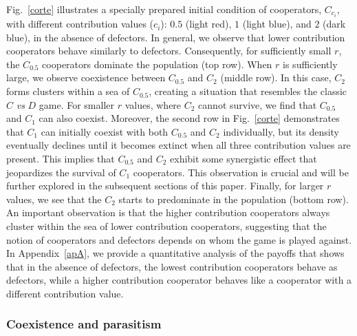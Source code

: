 \documentclass[twocolumn,aps,amsmath,pre,floatfix,superscriptaddress]{revtex4-2}
\begin{document}
Fig.~\ref{corte} illustrates a specially prepared initial condition of cooperators, $C_{c_i}$,  with different contribution values ($c_i$): $0.5$ (light red), $1$ (light blue), and $2$ (dark blue), in the absence of defectors. In general, we observe that lower contribution cooperators behave similarly to defectors. Consequently, for sufficiently small $r$, the $C_{0.5}$ cooperators dominate the population (top row). 
%
When $r$ is sufficiently large, we observe coexistence between $C_{0.5}$ and $C_{2}$ (middle row). In this case, $C_{2}$ forms clusters within a sea of $C_{0.5}$, creating a situation that resembles the classic $C$ \textit{vs} $D$ game. For smaller $r$ values, where $C_2$ cannot survive, we find that $C_{0.5}$ and $C_{1}$ can also coexist.
%
Moreover, the second row in Fig.~\ref{corte} demonstrates that $C_1$ can initially coexist with both $C_{0.5}$ and $C_2$ individually, but its density eventually declines until it becomes extinct when all three contribution values are present. This implies that $C_{0.5}$ and $C_2$ exhibit some synergistic effect that jeopardizes the survival of $C_1$ cooperators. This observation is crucial and will be further explored in the subsequent sections of this paper.
%
Finally, for larger $r$ values, we see that the $C_2$ starts to predominate in the population (bottom row).
%
An important observation is that the higher contribution cooperators always cluster within the sea of lower contribution cooperators, suggesting that the notion of cooperators and defectors depends on whom the game is played  against. In Appendix~\ref{apA}, we provide a quantitative analysis of the payoffs that shows that in the absence of defectors, the lowest contribution cooperators behave as defectors, while a higher contribution cooperator behaves like a cooperator with a different contribution value. 



\subsubsection*{Coexistence and parasitism}
\label{paras}
\end{document}
